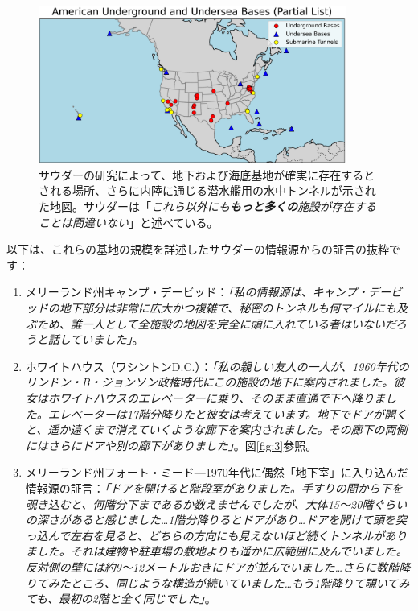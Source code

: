 \documentclass[10pt,twocolumn,letterpaper]{article}
\begin{document}
\begin{figure}[t]
\begin{center}
\includegraphics[width=0.9\textwidth]{basescrop.png}
\end{center}
   \caption{サウダーの研究によって、地下および海底基地が確実に存在するとされる場所、さらに内陸に通じる潜水艦用の水中トンネルが示された地図。サウダーは「\textit{これら以外にも\textbf{もっと多くの}施設が存在することは間違いない}」と述べている\cite{22}。}
   \label{fig:4}
\end{figure}

以下は、これらの基地の規模を詳述したサウダーの情報源からの証言の抜粋です：

\begin{flushleft}
\begin{enumerate}
    \item メリーランド州キャンプ・デービッド：\textit{「私の情報源は、キャンプ・デービッドの地下部分は非常に広大かつ複雑で、秘密のトンネルも何マイルにも及ぶため、誰一人として全施設の地図を完全に頭に入れている者はいないだろうと話していました」}\cite{22}。
    \item ホワイトハウス（ワシントンD.C.）：\textit{「私の親しい友人の一人が、1960年代のリンドン・B・ジョンソン政権時代にこの施設の地下に案内されました。彼女はホワイトハウスのエレベーターに乗り、そのまま直通で下へ降りました。エレベーターは17階分降りたと彼女は考えています。地下でドアが開くと、遥か遠くまで消えていくような廊下を案内されました。その廊下の両側にはさらにドアや別の廊下がありました」}\cite{22}。図\ref{fig:3}参照。
    \item メリーランド州フォート・ミード—1970年代に偶然「地下室」に入り込んだ情報源の証言：\textit{「ドアを開けると階段室がありました。手すりの間から下を覗き込むと、何階分下まであるか数えませんでしたが、大体15～20階ぐらいの深さがあると感じました…1階分降りるとドアがあり…ドアを開けて頭を突っ込んで左右を見ると、どちらの方向にも見えないほど続くトンネルがありました。それは建物や駐車場の敷地よりも遥かに広範囲に及んでいました。反対側の壁には約9～12メートルおきにドアが並んでいました…さらに数階降りてみたところ、同じような構造が続いていました…もう1階降りて覗いてみても、最初の2階と全く同じでした」}\cite{22}。
\end{enumerate}
\end{flushleft}
\end{document}
